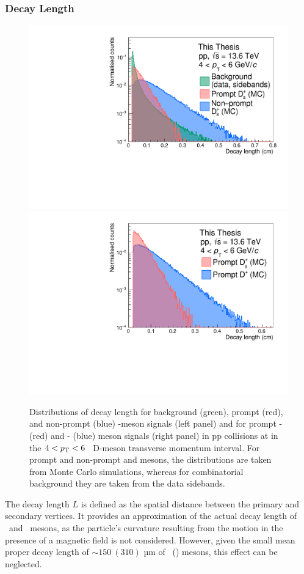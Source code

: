 \subsubsection{Decay Length}
\begin{figure}
    \centering
    \includegraphics[width=0.48\linewidth]{Figures/Chapter 4/DecayLength.pdf}
    \includegraphics[width=0.48\linewidth]{Figures/Chapter 4/DecayLengthDsDPlus.pdf}
    \caption{Distributions of decay length for background (green), prompt (red), and non-prompt (blue) \ds-meson signals (left panel) and for prompt \ds- (red) and \dpl- (blue) meson signals (right panel) in pp collisions at \thirteen in the \mbox{$4 < p_\mathrm{T} < 6$~\gevc} D-meson transverse momentum interval. For prompt and non-prompt \ds and \dpl mesons, the distributions are taken from Monte Carlo
    simulations, whereas for combinatorial background they are taken from the data sidebands.}
    \label{fig:DecayLength}
\end{figure}
The decay length $L$ is defined as the spatial distance between the primary and secondary vertices. It provides an approximation of the actual decay length of \ds\ and \dpl\ mesons, as the particle's curvature resulting from the motion in the presence of a magnetic field is not considered. However, given the small mean proper decay length of $\sim 150~(310)$ µm of \ds\ (\dpl) mesons, this effect can be neglected. 

